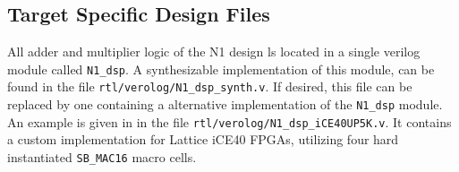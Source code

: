 \subsection{Target Specific Design Files}
\label{integration:ifs}
All adder and multiplier logic of the N1 design ls located in a single \gls{verilog} module called \texttt{N1\_dsp}.
A synthesizable implementation of this module, can be found in the file \texttt{rtl/verolog/N1\_dsp\_synth.v}.
If desired, this file can be replaced by one containing a alternative implementation of the \texttt{N1\_dsp} module.
An example is given in in the file \texttt{rtl/verolog/N1\_dsp\_iCE40UP5K.v}.
It contains a custom implementation for Lattice iCE40 FPGAs, utilizing four hard instantiated \texttt{SB\_MAC16}
macro cells.

